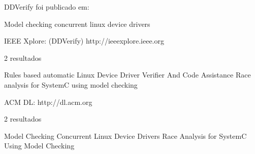 DDVerify foi publicado em:

Model checking concurrent linux device drivers

IEEE Xplore: (DDVerify)
http://ieeexplore.ieee.org

2 resultados

Rules based automatic Linux Device Driver Verifier And Code Assistance
Race analysis for SystemC using model checking

ACM DL:
http://dl.acm.org

2 resultados

Model Checking Concurrent Linux Device Drivers
Race Analysis for SystemC Using Model Checking
